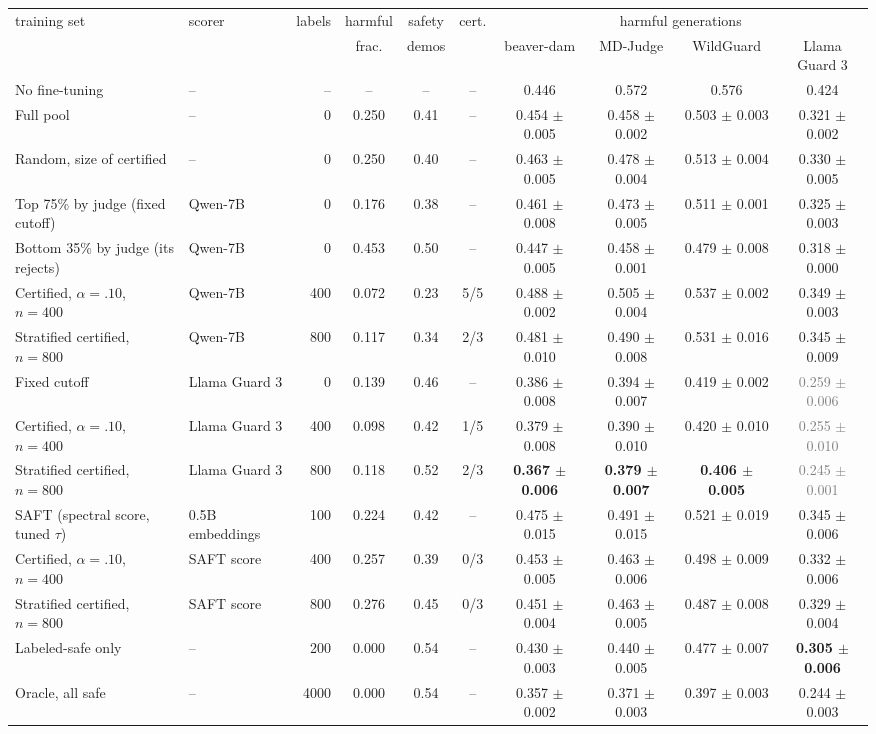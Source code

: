 \begin{tabular}{llrccccccc}
\toprule
training set & scorer & labels & harmful & safety & cert. & \multicolumn{4}{c}{harmful generations} \\
\cmidrule(lr){7-10}
 & & & frac. & demos & & beaver-dam & MD-Judge & WildGuard & Llama Guard 3 \\
\midrule
No fine-tuning & -- & -- & -- & -- & -- & 0.446 & 0.572 & 0.576 & 0.424 \\
Full pool & -- & 0 & 0.250 & 0.41 & -- & 0.454 $\pm$ 0.005 & 0.458 $\pm$ 0.002 & 0.503 $\pm$ 0.003 & 0.321 $\pm$ 0.002 \\
Random, size of certified & -- & 0 & 0.250 & 0.40 & -- & 0.463 $\pm$ 0.005 & 0.478 $\pm$ 0.004 & 0.513 $\pm$ 0.004 & 0.330 $\pm$ 0.005 \\
\midrule
Top 75\% by judge (fixed cutoff) & Qwen-7B & 0 & 0.176 & 0.38 & -- & 0.461 $\pm$ 0.008 & 0.473 $\pm$ 0.005 & 0.511 $\pm$ 0.001 & 0.325 $\pm$ 0.003 \\
Bottom 35\% by judge (its rejects) & Qwen-7B & 0 & 0.453 & 0.50 & -- & 0.447 $\pm$ 0.005 & 0.458 $\pm$ 0.001 & 0.479 $\pm$ 0.008 & 0.318 $\pm$ 0.000 \\
Certified, $\alpha{=}.10$, $n{=}400$ & Qwen-7B & 400 & 0.072 & 0.23 & 5/5 & 0.488 $\pm$ 0.002 & 0.505 $\pm$ 0.004 & 0.537 $\pm$ 0.002 & 0.349 $\pm$ 0.003 \\
Stratified certified, $n{=}800$ & Qwen-7B & 800 & 0.117 & 0.34 & 2/3 & 0.481 $\pm$ 0.010 & 0.490 $\pm$ 0.008 & 0.531 $\pm$ 0.016 & 0.345 $\pm$ 0.009 \\
\midrule
Fixed cutoff & Llama Guard 3 & 0 & 0.139 & 0.46 & -- & 0.386 $\pm$ 0.008 & 0.394 $\pm$ 0.007 & 0.419 $\pm$ 0.002 & \textcolor{gray}{0.259 $\pm$ 0.006} \\
Certified, $\alpha{=}.10$, $n{=}400$ & Llama Guard 3 & 400 & 0.098 & 0.42 & 1/5 & 0.379 $\pm$ 0.008 & 0.390 $\pm$ 0.010 & 0.420 $\pm$ 0.010 & \textcolor{gray}{0.255 $\pm$ 0.010} \\
Stratified certified, $n{=}800$ & Llama Guard 3 & 800 & 0.118 & 0.52 & 2/3 & \textbf{0.367 $\pm$ 0.006} & \textbf{0.379 $\pm$ 0.007} & \textbf{0.406 $\pm$ 0.005} & \textcolor{gray}{0.245 $\pm$ 0.001} \\
\midrule
SAFT (spectral score, tuned $\tau$) & 0.5B embeddings & 100 & 0.224 & 0.42 & -- & 0.475 $\pm$ 0.015 & 0.491 $\pm$ 0.015 & 0.521 $\pm$ 0.019 & 0.345 $\pm$ 0.006 \\
Certified, $\alpha{=}.10$, $n{=}400$ & SAFT score & 400 & 0.257 & 0.39 & 0/3 & 0.453 $\pm$ 0.005 & 0.463 $\pm$ 0.006 & 0.498 $\pm$ 0.009 & 0.332 $\pm$ 0.006 \\
Stratified certified, $n{=}800$ & SAFT score & 800 & 0.276 & 0.45 & 0/3 & 0.451 $\pm$ 0.004 & 0.463 $\pm$ 0.005 & 0.487 $\pm$ 0.008 & 0.329 $\pm$ 0.004 \\
\midrule
Labeled-safe only & -- & 200 & 0.000 & 0.54 & -- & 0.430 $\pm$ 0.003 & 0.440 $\pm$ 0.005 & 0.477 $\pm$ 0.007 & \textbf{0.305 $\pm$ 0.006} \\
Oracle, all safe & -- & 4000 & 0.000 & 0.54 & -- & 0.357 $\pm$ 0.002 & 0.371 $\pm$ 0.003 & 0.397 $\pm$ 0.003 & 0.244 $\pm$ 0.003 \\
\bottomrule
\end{tabular}
